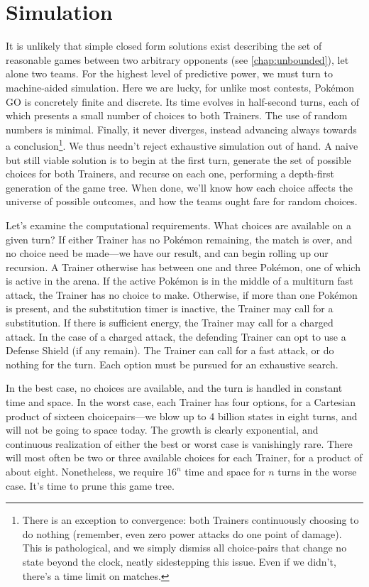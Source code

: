 \chapter{Simulation}
\label{chap:simul}

It is unlikely that simple closed form solutions exist describing
 the set of reasonable games between two arbitrary opponents (see \autoref{chap:unbounded}),
 let alone two teams.
For the highest level of predictive power, we must turn to machine-aided simulation.
Here we are lucky, for unlike most contests, Pokémon GO is concretely finite and discrete.
Its time evolves in half-second turns, each of which presents a small number of choices
  to both Trainers.
The use of random numbers is minimal.
Finally, it never diverges, instead advancing always towards a conclusion\footnote{There
  is an exception to convergence: both Trainers continuously choosing to do nothing (remember,
  even zero power attacks do one point of damage). This is pathological, and we
  simply dismiss all choice-pairs that change no state beyond the clock, neatly sidestepping this issue.
  Even if we didn't, there's a time limit on matches.}.
We thus needn't reject exhaustive simulation out of hand.
A naive but still viable solution is to begin at the first turn, generate the set
  of possible choices for both Trainers, and recurse on each one, performing
  a depth-first generation of the game tree.
When done, we'll know how each choice affects the universe of possible outcomes,
  and how the teams ought fare for random choices.

Let's examine the computational requirements.
What choices are available on a given turn?
If either Trainer has no Pokémon remaining, the match is over, and no choice
  need be made---we have our result, and can begin rolling up our recursion.
A Trainer otherwise has between one and three Pokémon, one of which is active
  in the arena.
If the active Pokémon is in the middle of a multiturn fast attack, the
  Trainer has no choice to make.
Otherwise, if more than one Pokémon is present, and the substitution timer is
  inactive, the Trainer may call for a substitution.
If there is sufficient energy, the Trainer may call for a charged attack.
In the case of a charged attack, the defending Trainer can opt to use a Defense
  Shield (if any remain).
The Trainer can call for a fast attack, or do nothing for the turn.
Each option must be pursued for an exhaustive search.

In the best case, no choices are available, and the turn is handled in constant
  time and space.
In the worst case, each Trainer has four options, for a Cartesian product
  of sixteen choicepairs---we blow up to 4 billion states in eight turns,
  and will not be going to space today.
The growth is clearly exponential, and continuous realization of either the
  best or worst case is vanishingly rare.
There will most often be two or three available choices for each Trainer,
  for a product of about eight.
Nonetheless, we require $16^n$ time and space for $n$ turns in the worse case.
It's time to prune this game tree.

